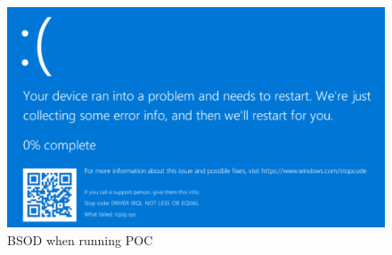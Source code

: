 \documentclass{report}
\begin{document}
\begin{figure}[H]
	\centering
    \includegraphics[width=\textwidth]{bsod.png}
    \caption{\gls{BSOD} when running \gls{POC}}
    \label{fig:poc:bsod}
\end{figure}
\end{document}
